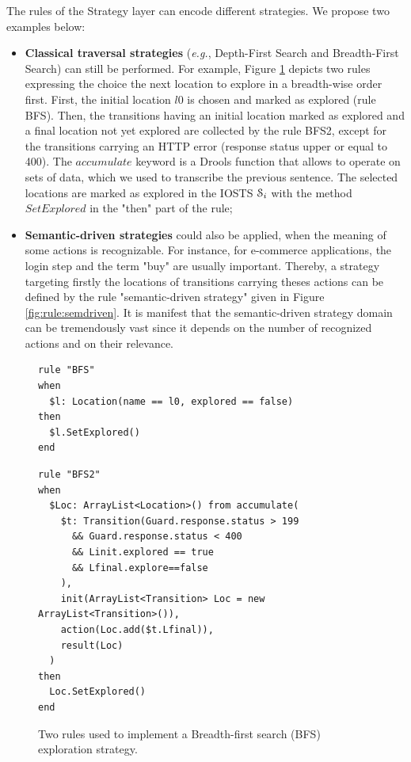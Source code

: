 The rules of the Strategy layer can encode different strategies.
We propose two examples below:

\begin{itemize}
    \item \textbf{Classical traversal strategies} (\emph{e.g.},
        Depth-First Search and Breadth-First Search) can still be
        performed.  For example, Figure \ref{fig:rule:bfs}
        depicts two rules expressing the choice the next location
        to explore in a breadth-wise order first. First, the
        initial location $l0$ is chosen and marked as explored
        (rule BFS).  Then, the transitions having an initial
        location marked as explored and a final location not yet
        explored are collected by the rule BFS2, except for the
        transitions carrying an HTTP error (response status upper
        or equal to 400).  The $accumulate$ keyword is a Drools
        function that allows to operate on sets of data, which we
        used to transcribe the previous sentence.  The selected
        locations are marked as explored in the IOSTS
        $\EuScript{S}_i$ with the method $SetExplored$ in the
        "then" part of the rule;

    \item \textbf{Semantic-driven strategies} could also be
        applied, when the meaning of some actions is
        recognizable. For instance, for e-commerce applications,
        the login step and the term "buy" are usually important.
        Thereby, a strategy targeting firstly the locations of
        transitions carrying theses actions can be defined by the
        rule "semantic-driven strategy" given in Figure
        \ref{fig:rule:semdriven}.  It is manifest that the
        semantic-driven strategy domain can be tremendously vast
        since it depends on the number of recognized actions and
        on their relevance.
\end{itemize}

\begin{figure}[h]
\begin{framed}
\begin{BVerbatim}
rule "BFS"
when
  $l: Location(name == l0, explored == false)
then
  $l.SetExplored()
end
\end{BVerbatim}
\end{framed}

\begin{framed}
\begin{BVerbatim}
rule "BFS2"
when
  $Loc: ArrayList<Location>() from accumulate(
    $t: Transition(Guard.response.status > 199
      && Guard.response.status < 400
      && Linit.explored == true
      && Lfinal.explore==false
    ),
    init(ArrayList<Transition> Loc = new ArrayList<Transition>()),
    action(Loc.add($t.Lfinal)),
    result(Loc)
  )
then
  Loc.SetExplored()
end
\end{BVerbatim}
\end{framed}

\caption{Two rules used to implement a Breadth-first search (BFS)
exploration strategy.}
\label{fig:rule:bfs}
\end{figure}

